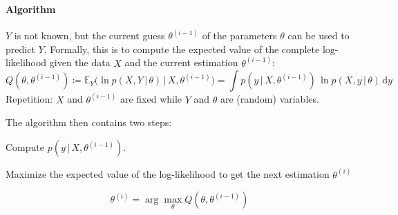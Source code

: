 \documentclass[a4paper, 11pt, accentcolor = tud3b]{tudreport}
\newcommand{\E}{\ensuremath{\mathbb{E}}}
\newcommand{\given}{\ensuremath{\,\vert\,}}
\newcommand{\dif}[1]{\ensuremath{\,\mathrm{d}#1}}
\begin{document}
					\paragraph{Algorithm}
						\(Y\) is not known, but the current guess \( \theta^{(i - 1)} \) of the parameters \(\theta\) can be used to predict \(Y\). Formally, this is to compute the expected value of the complete log-likelihood given the data \(X\) and the current estimation \(\theta^{(i - 1)}\):
						\begin{equation}
							Q(\theta, \theta^{(i - 1)}) \coloneqq \E_Y\big( \ln p(X, Y \given \theta) \given X, \theta^{(i - 1)} \big) = \int p(y \given X, \theta^{(i - 1)}) \,\ln p(X, y \given \theta) \dif{y}
						\end{equation}
						Repetition: \(X\) and \(\theta^{(i - 1)}\) are fixed while \(Y\) and \(\theta\) are (random) variables.

						The algorithm then contains two steps:
						\begin{description}[leftmargin = 5cm]
							\item[E-Step (Expectation)] Compute \( p(y \given X, \theta^{(i - 1)}) \).
							\item[M-Step (Maximization)] Maximize the expected value of the log-likelihood to get the next estimation \( \theta^{(i)} \)
						\end{description}
						\begin{equation}
							\theta^{(i)} = \arg\max\limits_\theta Q(\theta, \theta^{(i - 1)})
						\end{equation}
\end{document}
